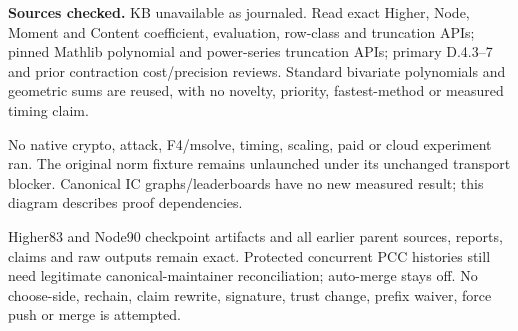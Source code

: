 \documentclass[10pt]{article}
\begin{document}
\textbf{Sources checked.} KB unavailable as journaled. Read exact Higher,
Node, Moment and Content coefficient, evaluation, row-class and truncation
APIs; pinned Mathlib polynomial and power-series truncation APIs; primary
D.4.3--7 and prior contraction cost/precision reviews. Standard bivariate
polynomials and geometric sums are reused, with no novelty, priority,
fastest-method or measured timing claim.

No native crypto, attack, F4/msolve, timing, scaling, paid or cloud experiment
ran. The original norm fixture remains unlaunched under its unchanged
transport blocker. Canonical IC graphs/leaderboards have no new measured
result; this diagram describes proof dependencies.

Higher83 and Node90 checkpoint artifacts and all earlier parent sources,
reports, claims and raw outputs remain exact. Protected concurrent PCC
histories still need legitimate canonical-maintainer reconciliation;
auto-merge stays off. No choose-side, rechain, claim rewrite, signature,
trust change, prefix waiver, force push or merge is attempted.
\end{document}
